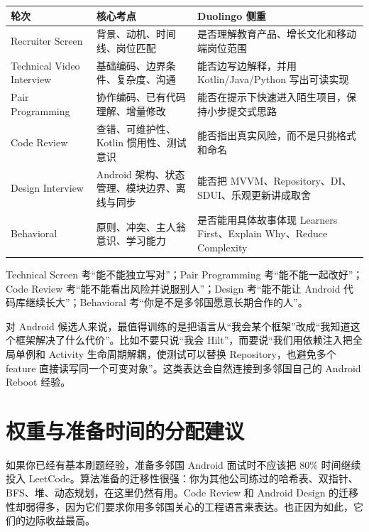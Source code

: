 \begin{center}
\begin{tabularx}{\linewidth}{@{}l X X@{}}
\toprule
\textbf{轮次} & \textbf{核心考点} & \textbf{Duolingo 侧重} \\
\midrule
Recruiter Screen & 背景、动机、时间线、岗位匹配 & 是否理解教育产品、增长文化和移动端岗位范围 \\
Technical Video Interview & 基础编码、边界条件、复杂度、沟通 & 能否边写边解释，并用 Kotlin/Java/Python 写出可读实现 \\
Pair Programming & 协作编码、已有代码理解、增量修改 & 能否在提示下快速进入陌生项目，保持小步提交式思路 \\
Code Review & 查错、可维护性、Kotlin 惯用性、测试意识 & 能否指出真实风险，而不是只挑格式和命名 \\
Design Interview & Android 架构、状态管理、模块边界、离线与同步 & 能否把 MVVM、Repository、DI、SDUI、乐观更新讲成取舍 \\
Behavioral & 原则、冲突、主人翁意识、学习能力 & 是否能用具体故事体现 Learners First、Explain Why、Reduce Complexity \\
\bottomrule
\end{tabularx}
\end{center}

\begin{keypoint}[一句话区分]
Technical Screen 考“能不能独立写对”；Pair Programming 考“能不能一起改好”；Code Review 考“能不能看出风险并说服别人”；Design 考“能不能让 Android 代码库继续长大”；Behavioral 考“你是不是多邻国愿意长期合作的人”。
\end{keypoint}

对 Android 候选人来说，最值得训练的是把语言从“我会某个框架”改成“我知道这个框架解决了什么代价”。比如不要只说“我会 Hilt”，而要说“我们用依赖注入把全局单例和 Activity 生命周期解耦，使测试可以替换 Repository，也避免多个 feature 直接读写同一个可变对象”。这类表达会自然连接到多邻国自己的 Android Reboot 经验。

\section{权重与准备时间的分配建议}

如果你已经有基本刷题经验，准备多邻国 Android 面试时不应该把 80\% 时间继续投入 LeetCode。算法准备的迁移性很强：你为其他公司练过的哈希表、双指针、BFS、堆、动态规划，在这里仍然有用。Code Review 和 Android Design 的迁移性却弱得多，因为它们要求你用多邻国关心的工程语言来表达。也正因为如此，它们的边际收益最高。

